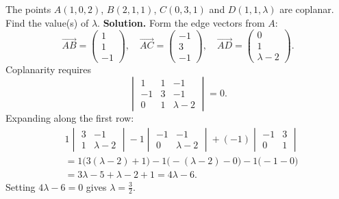 \documentclass[11pt]{article}
\begin{document}
\begin{exoresolu}
The points $A(1, 0, 2)$, $B(2, 1, 1)$, $C(0, 3, 1)$ and $D(1, 1, \lambda)$ are coplanar. Find the value(s) of $\lambda$.
\tcblower
\textbf{Solution.} Form the edge vectors from $A$:
\[
\overrightarrow{AB} = \begin{pmatrix} 1 \\ 1 \\ -1 \end{pmatrix}, \quad
\overrightarrow{AC} = \begin{pmatrix} -1 \\ 3 \\ -1 \end{pmatrix}, \quad
\overrightarrow{AD} = \begin{pmatrix} 0 \\ 1 \\ \lambda - 2 \end{pmatrix}.
\]
Coplanarity requires
\[
\begin{vmatrix}
1 & 1 & -1 \\
-1 & 3 & -1 \\
0 & 1 & \lambda - 2
\end{vmatrix} = 0.
\]
Expanding along the first row:
\begin{align*}
&1 \begin{vmatrix} 3 & -1 \\ 1 & \lambda-2 \end{vmatrix}
- 1 \begin{vmatrix} -1 & -1 \\ 0 & \lambda-2 \end{vmatrix}
+ (-1) \begin{vmatrix} -1 & 3 \\ 0 & 1 \end{vmatrix} \\
&= 1\bigl(3(\lambda-2) + 1\bigr) - 1\bigl(-(\lambda-2) - 0\bigr) - 1\bigl(-1 - 0\bigr) \\
&= 3\lambda - 5 + \lambda - 2 + 1 = 4\lambda - 6.
\end{align*}
Setting $4\lambda - 6 = 0$ gives $\boxed{\lambda = \tfrac{3}{2}}$.
\end{exoresolu}
\end{document}

